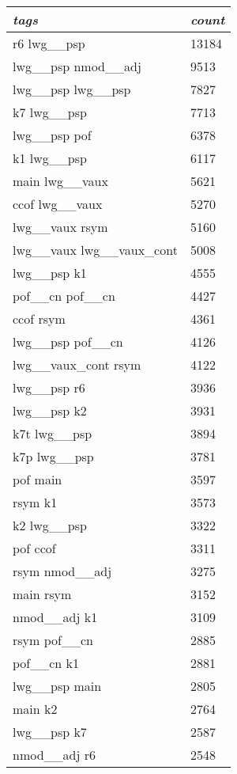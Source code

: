 \documentclass[a4 paper]{article}
\begin{document}
\begin{longtable}{p{}p{}}
    \toprule
    \textit{tags} & \textit{count}\\
    \toprule
r6 lwg\_\_psp  & 13184 \\ \midrule
lwg\_\_psp nmod\_\_adj  & 9513 \\ \midrule
lwg\_\_psp lwg\_\_psp  & 7827 \\ \midrule
k7 lwg\_\_psp  & 7713 \\ \midrule
lwg\_\_psp pof  & 6378 \\ \midrule
k1 lwg\_\_psp  & 6117 \\ \midrule
main lwg\_\_vaux  & 5621 \\ \midrule
ccof lwg\_\_vaux  & 5270 \\ \midrule
lwg\_\_vaux rsym  & 5160 \\ \midrule
lwg\_\_vaux lwg\_\_vaux\_cont  & 5008 \\ \midrule
lwg\_\_psp k1  & 4555 \\ \midrule
pof\_\_cn pof\_\_cn  & 4427 \\ \midrule
ccof rsym  & 4361 \\ \midrule
lwg\_\_psp pof\_\_cn  & 4126 \\ \midrule
lwg\_\_vaux\_cont rsym  & 4122 \\ \midrule
lwg\_\_psp r6  & 3936 \\ \midrule
lwg\_\_psp k2  & 3931 \\ \midrule
k7t lwg\_\_psp  & 3894 \\ \midrule
k7p lwg\_\_psp  & 3781 \\ \midrule
pof main  & 3597 \\ \midrule
rsym k1  & 3573 \\ \midrule
k2 lwg\_\_psp  & 3322 \\ \midrule
pof ccof  & 3311 \\ \midrule
rsym nmod\_\_adj  & 3275 \\ \midrule
main rsym  & 3152 \\ \midrule
nmod\_\_adj k1  & 3109 \\ \midrule
rsym pof\_\_cn  & 2885 \\ \midrule
pof\_\_cn k1  & 2881 \\ \midrule
lwg\_\_psp main  & 2805 \\ \midrule
main k2  & 2764 \\ \midrule
lwg\_\_psp k7  & 2587 \\ \midrule
nmod\_\_adj r6  & 2548 \\ \midrule

\end{longtable}
\end{document}
